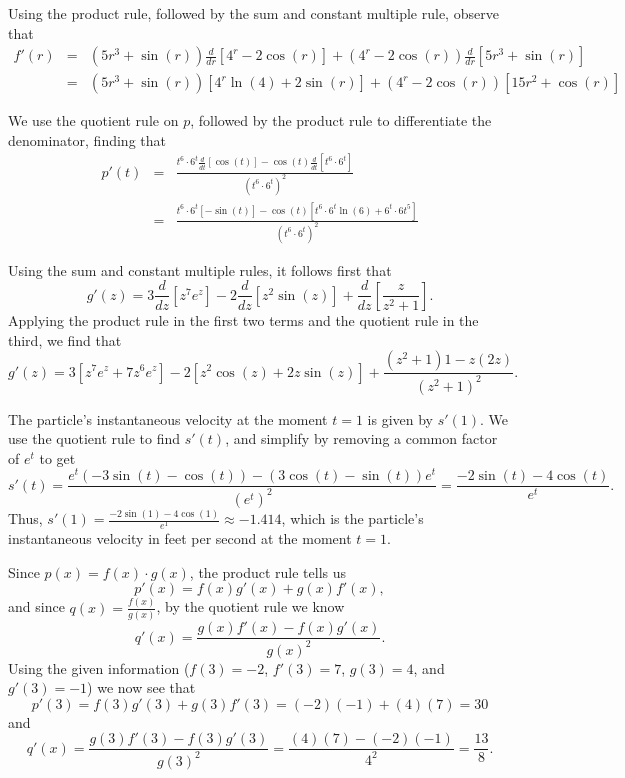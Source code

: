 \begin{activitySolution}
\ba
	\item Using the product rule, followed by the sum and constant multiple rule, observe that
	\begin{eqnarray*}
	f'(r) & = & (5r^3 + \sin(r))\frac{d}{dr}[4^r - 2\cos(r)] +  (4^r - 2\cos(r))\frac{d}{dr}[5r^3 + \sin(r)] \\
	      & = &  (5r^3 + \sin(r))[4^r \ln(4) + 2\sin(r)] +  (4^r - 2\cos(r))[15r^2 + \cos(r)]
	\end{eqnarray*}
	\item We use the quotient rule on $p$, followed by the product rule to differentiate the denominator, finding that
	\begin{eqnarray*}
	  p'(t) & = & \frac{t^6 \cdot 6^t \frac{d}{dt}[\cos(t)] - \cos(t) \frac{d}{dt}[t^6 \cdot 6^t]}{(t^6 \cdot 6^t)^2} \\
	         & = & \frac{t^6 \cdot 6^t [-\sin(t)] - \cos(t) [t^6 \cdot 6^t \ln(6) + 6^t \cdot 6t^5]}{(t^6 \cdot 6^t)^2}
	\end{eqnarray*}
		
	\item Using the sum and constant multiple rules, it follows first that
	$$g'(z) = 3 \frac{d}{dz}[z^7 e^z] - 2\frac{d}{dz}[z^2 \sin(z)] + \frac{d}{dz}\left[ \frac{z}{z^2 + 1} \right].$$  
	Applying the product rule in the first two terms and the quotient rule in the third, we find that
	$$g'(z) = 3 [z^7 e^z +  7z^6e^z] - 2[z^2 \cos(z) + 2z\sin(z)] + \frac{(z^2+1) 1 - z(2z)}{(z^2 + 1)^2}.$$  

	\item The particle's instantaneous velocity at the moment $t = 1$ is given by $s'(1)$.  We use the quotient rule to find $s'(t)$, and simplify by removing a common factor of $e^t$ to get
	$$s'(t) = \frac{e^t(-3\sin(t) - \cos(t))-(3\cos(t) - \sin(t))e^t}{(e^t)^2} = \frac{-2\sin(t)-4\cos(t)}{e^t}.$$
	Thus, $s'(1) = \frac{-2\sin(1)-4\cos(1)}{e^1} \approx -1.414$, which is the particle's instantaneous velocity in feet per second at the moment $t = 1$.
	\item Since $p(x) = f(x) \cdot g(x)$, the product rule tells us
	$$p'(x) = f(x)g'(x) + g(x)f'(x),$$
	and since $\displaystyle q(x) = \frac{f(x)}{g(x)}$, by the quotient rule we know
	$$q'(x) = \frac{g(x)f'(x)-f(x)g'(x)}{g(x)^2}.$$
	Using the given information ($f(3) = -2$, $f'(3) = 7$, $g(3) = 4$, and  $g'(3) = -1$) we now see that
	$$p'(3) = f(3)g'(3) + g(3)f'(3) = (-2)(-1) + (4)(7) = 30$$
	and
	$$q'(x) = \frac{g(3)f'(3)-f(3)g'(3)}{g(3)^2} = \frac{(4)(7) - (-2)(-1)}{4^2} = \frac{13}{8}.$$
\ea
\end{activitySolution}
\aftera